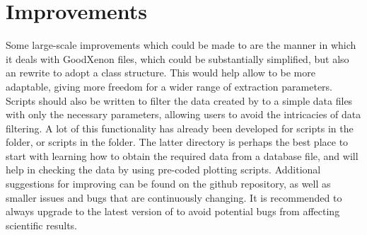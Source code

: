 \section*{Improvements}
Some large-scale improvements which could be made to \chromos are the manner in which it deals with GoodXenon files, which could be substantially simplified, but also an rewrite to adopt a class structure. This would help allow \chromos to be more adaptable, giving more freedom for a wider range of extraction parameters. Scripts should also be written to filter the data created by \chromos to a simple data files with only the necessary parameters, allowing users to avoid the intricacies of data filtering. A lot of this functionality has already been developed for scripts in the  folder, or scripts in the  folder. The latter directory is perhaps the best place to start with learning how to obtain the required data from a database file, and will help in checking the data by using pre-coded plotting scripts. Additional suggestions for improving \chromos can be found on the github repository, as well as smaller issues and bugs that are continuously changing. It is recommended to always upgrade to the latest version of \chromos to avoid potential bugs from affecting scientific results.\\

